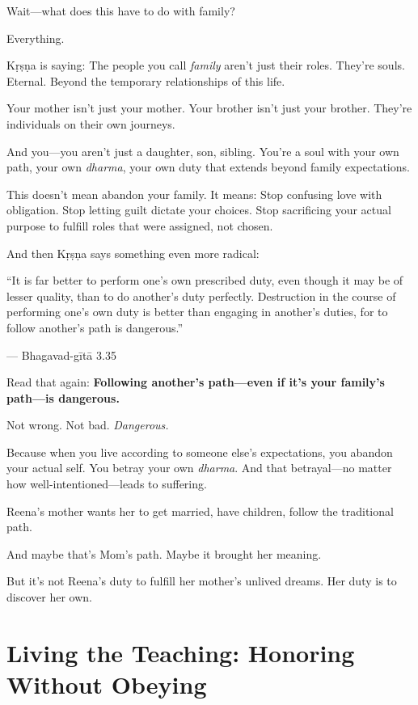 \documentclass[11pt,twoside]{book}
\begin{document}
Wait—what does this have to do with family?

Everything.

Kṛṣṇa is saying: The people you call \emph{family} aren't just their roles. They're souls. Eternal. Beyond the temporary relationships of this life.

Your mother isn't just your mother. Your brother isn't just your brother. They're individuals on their own journeys.

And you—you aren't just a daughter, son, sibling. You're a soul with your own path, your own \emph{dharma}, your own duty that extends beyond family expectations.

This doesn't mean abandon your family. It means: Stop confusing love with obligation. Stop letting guilt dictate your choices. Stop sacrificing your actual purpose to fulfill roles that were assigned, not chosen.

And then Kṛṣṇa says something even more radical:

\begin{pullquote}
``It is far better to perform one's own prescribed duty, even though it may be of lesser quality, than to do another's duty perfectly. Destruction in the course of performing one's own duty is better than engaging in another's duties, for to follow another's path is dangerous.''

--- Bhagavad-gītā 3.35
\end{pullquote}

Read that again: \textbf{Following another's path—even if it's your family's path—is dangerous.}

Not wrong. Not bad. \emph{Dangerous.}

Because when you live according to someone else's expectations, you abandon your actual self. You betray your own \emph{dharma}. And that betrayal—no matter how well-intentioned—leads to suffering.

Reena's mother wants her to get married, have children, follow the traditional path.

And maybe that's Mom's path. Maybe it brought her meaning.

But it's not Reena's duty to fulfill her mother's unlived dreams. Her duty is to discover her own.

\section*{Living the Teaching: Honoring Without Obeying}
\end{document}
